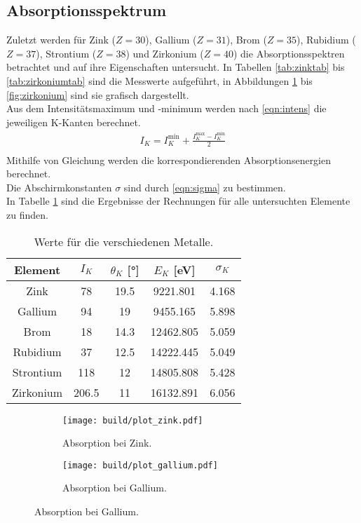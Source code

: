 \subsection{Absorptionsspektrum}
  Zuletzt werden für Zink ($Z = 30$), Gallium ($Z = 31$), Brom ($Z = 35$), Rubidium ($Z = 37$), Strontium ($Z = 38$) und Zirkonium ($Z = 40$) die Absorptionsspektren betrachtet und auf ihre
  Eigenschaften untersucht. In Tabellen \ref{tab:zinktab} bis \ref{tab:zirkoniumtab} sind die Messwerte aufgeführt, in 
  Abbildungen \ref{fig:zink} bis \ref{fig:zirkonium} sind sie grafisch dargestellt.\\
  Aus dem Intensitätsmaximum und -minimum werden nach \eqref{eqn:intens} die jeweiligen K-Kanten berechnet.
  \begin{align}
    I_K = I_K^{\text{min}} + \frac{I_K^{\text{max}} - I_K^{\text{min}}}{2}\\
    \label{eqn:intens}
  \end{align}
  Mithilfe von Gleichung %
  werden die korrespondierenden Absorptionsenergien berechnet. \\
  Die Abschirmkonstanten $\sigma$ sind durch \eqref{eqn:sigma}
  zu bestimmen.\\
  In Tabelle \ref{tab:results} sind die Ergebnisse der Rechnungen für alle untersuchten Elemente zu finden.

  \begin{table}
    \centering
    \caption{Werte für die verschiedenen Metalle.}
    \label{tab:results}
    \begin{tabular}{c c c c c}
      \toprule
      Element & $I_K$ & $\theta_K$ [°] & $E_K$ [eV]& $\sigma_K$ \\
      \midrule
      Zink & 78 & 19.5 & 9221.801 & 4.168 \\
      Gallium & 94 & 19 & 9455.165 & 5.898 \\
      Brom & 18 & 14.3 & 12462.805 & 5.059 \\
      Rubidium & 37 & 12.5 & 14222.445 & 5.049 \\
      Strontium & 118 & 12 & 14805.808 & 5.428 \\
      Zirkonium & 206.5 & 11 & 16132.891 & 6.056 \\
      \bottomrule
    \end{tabular}
  \end{table}
  \FloatBarrier

  \begin{figure}
    \centering
    \begin{subfigure}{0.30\textwidth}
      \centering
      \texttt{[image: build/plot\_zink.pdf]}
      \caption{Absorption bei Zink.}
      \label{fig:zink}
    \end{subfigure}
    \hfill
    \begin{subfigure}{0.30\textwidth}
      \centering
      \texttt{[image: build/plot\_gallium.pdf]}
      \caption{Absorption bei Gallium.}
      \label{fig:gallium}
    \end{subfigure}
  \end{figure}


